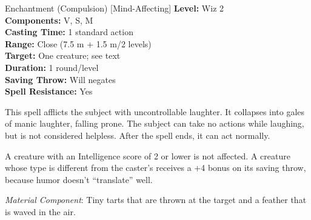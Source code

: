 {Enchantment (Compulsion) [Mind-Affecting]}
{
	\textbf{Level:}
	Wiz 2\\
	\textbf{Components:}
	V, S, M\\
	\textbf{Casting Time:}
	1 standard action\\
	\textbf{Range:}
	Close (7.5 m + 1.5 m/2 levels)\\
	\textbf{Target:}
	One creature; see text\\
	\textbf{Duration:}
	1 round/level\\
	\textbf{Saving Throw:}
	Will negates\\
	\textbf{Spell Resistance:}
	Yes\\
}
{
	This spell afflicts the subject with uncontrollable laughter. It collapses into gales of manic laughter, falling prone. The subject can take no actions while laughing, but is not considered helpless. After the spell ends, it can act normally.

	A creature with an Intelligence score of 2 or lower is not affected. A creature whose type is different from the caster's receives a +4 bonus on its saving throw, because humor doesn't ``translate'' well.

	\textit{Material Component}:
	Tiny tarts that are thrown at the target and a feather that is waved in the air.

}
